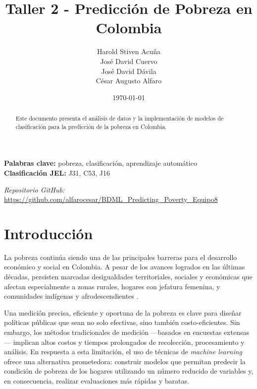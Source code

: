 \documentclass[12pt,a4paper,onecolumn]{article}
\title{\textbf{Taller 2 - Predicción de Pobreza en Colombia}}
\author{%
\begin{center}
Harold Stiven Acuña\\
José David Cuervo\\
José David Dávila\\
César Augusto Alfaro
\end{center}%
}
\date{\today}
\begin{document}
\maketitle
\thispagestyle{empty}


\begin{abstract}
Este documento presenta el análisis de datos y la implementación de modelos de clasificación para la predicción de la pobreza en Colombia.
\end{abstract}

\medskip

\begin{flushleft}
    {\bf Palabras clave:} pobreza, clasificación, aprendizaje automático \\
    {\bf Clasificación JEL:} J31, C53, J16
\end{flushleft}

\begin{center}
    \textit{Repositorio GitHub:} \url{https://github.com/alfarocesar/BDML_Predicting_Poverty_Equipo8}
\end{center}

\pagebreak
\singlespacing
\setlength{\parindent}{0pt}
\setlength{\parskip}{1em}


\section{Introducción}

La pobreza continúa siendo una de las principales barreras para el desarrollo económico y social en Colombia. A pesar de los avances logrados en las últimas décadas, persisten marcadas desigualdades territoriales, sociales y económicas que afectan especialmente a zonas rurales, hogares con jefatura femenina, y comunidades indígenas y afrodescendientes \citep{bm2024}.

Una medición precisa, eficiente y oportuna de la pobreza es clave para diseñar políticas públicas que sean no solo efectivas, sino también costo-eficientes. Sin embargo, los métodos tradicionales de medición —basados en encuestas extensas— implican altos costos y tiempos prolongados de recolección, procesamiento y análisis. En respuesta a esta limitación, el uso de técnicas de \textit{machine learning} ofrece una alternativa prometedora: construir modelos que permitan predecir la condición de pobreza de los hogares utilizando un número reducido de variables y, en consecuencia, realizar evaluaciones más rápidas y baratas.
\end{document}
